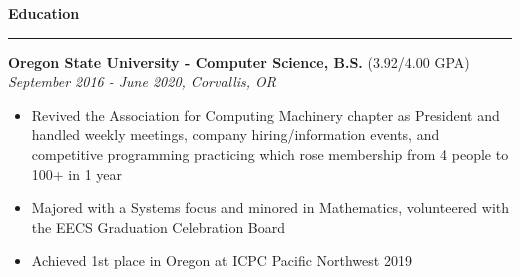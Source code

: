 \documentclass{article}
\def\hrulefill{\leavevmode\leaders\hrule height 1.2pt\hfill\kern\z}
\begin{document}
\vskip 0.1in

\noindent \large \textbf{Education } \hrulefill
\vskip 0.1in

\noindent \normalsize \textbf{Oregon State University - Computer Science, B.S.} \footnotesize (3.92/4.00 GPA) \hfill \small \textit{September 2016 - June 2020, Corvallis, OR}
\begin{itemize}
    \item Revived the Association for Computing Machinery chapter as President and handled weekly meetings, company hiring/information events, and competitive programming practicing which rose membership from 4 people to 100+ in 1 year
    \item Majored with a Systems focus and minored in Mathematics, volunteered with the EECS Graduation Celebration Board
    \item Achieved 1st place in Oregon at ICPC Pacific Northwest 2019
\end{itemize}
\end{document}
